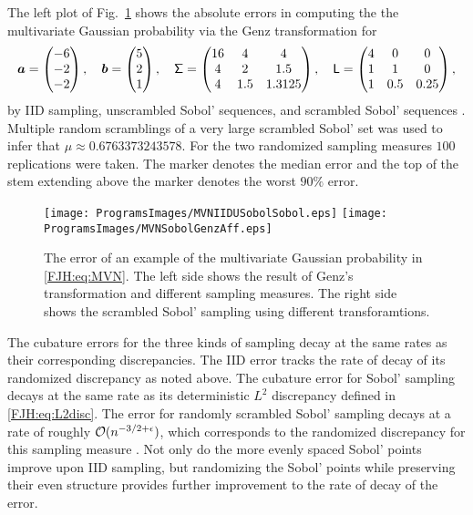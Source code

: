 \documentclass[graybox,footinfo]{svmult}
\begin{document}
The left plot of Fig.\ \ref{FJH:fig:MVNfig} shows the absolute errors in computing the the 
multivariate 
Gaussian probability via the Genz transformation for 
\[
   {\boldsymbol{a}}  = \begin{pmatrix}
   -6 \\ -2 \\ -2
   \end{pmatrix}, \quad
      {\boldsymbol{b}}  = \begin{pmatrix}
   5 \\ 2 \\ 1
   \end{pmatrix}, \quad
   \mathsf{\Sigma} = \begin{pmatrix} 16 & 4 & 4 \\ 4 &  2 &  1.5 \\
  4 & 1.5 &  1.3125 \end{pmatrix}, \quad
   \mathsf{L} = \begin{pmatrix} 4 & 0 & 0 \\ 1 &  1 &  0 \\
1 & 0.5 &  0.25 \end{pmatrix}, 
\]
by IID sampling, unscrambled Sobol' sequences, and scrambled Sobol' sequences   
\cite{Owe95, Owe98c}.
Multiple random scramblings of a very large scrambled Sobol' set was used to infer that 
$\mu \approx 0.6763373243578$.   For the two randomized sampling measures $100$ 
replications were taken.  The marker denotes the median error and the top of the stem 
extending above the marker denotes the worst $90\%$ error.

\begin{figure}
	\centering
	\texttt{[image: ProgramsImages/MVNIIDUSobolSobol.eps]} 
	\qquad 
	\texttt{[image: ProgramsImages/MVNSobolGenzAff.eps]}
	\caption{The error of an example of the multivariate Gaussian probability in 
	\eqref{FJH:eq:MVN}.  The left side shows the result of Genz's transformation and 
	different sampling measures.  The right side shows the scrambled Sobol' sampling 
	using different transforamtions.
	\label{FJH:fig:MVNfig}}
\end{figure}

The cubature errors for the three kinds of sampling decay at the same rates as their 
corresponding discrepancies.  The IID error tracks the rate of decay of its randomized 
discrepancy as noted above.  The cubature  error for  Sobol' 
sampling decays at the same rate as its deterministic $L^2$ discrepancy defined in 
\eqref{FJH:eq:L2disc}.  The error for randomly scrambled Sobol' 
sampling decays at a rate of roughly $\mathcal{O}(n^{-3/2+\epsilon})$, which corresponds to 
the randomized discrepancy for this sampling measure \cite{HeiHicYue02a,Owe97}.  
Not only do the more evenly spaced Sobol' points improve upon IID sampling, but 
randomizing the Sobol' points while preserving their even structure provides further 
improvement to the rate of decay of the error.
\end{document}
